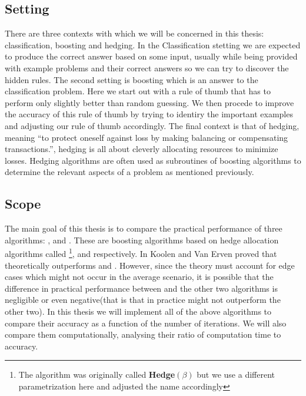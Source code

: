 \subsection{Setting}
There are three contexts with which we will be concerned in this thesis: classification, boosting and hedging.
In the Classification stetting we are expected to produce the correct answer based on some input, usually while being provided with example problems and their correct answers so we can try to discover the hidden rules. The second setting is boosting which is an answer to the classification problem. Here we start out with a rule of thumb that has to perform only slightly better than random guessing. We then procede to improve the accuracy of this rule of thumb by trying to identiry the important examples and adjusting our rule of thumb accordingly. The final context is that of hedging, meaning ``to protect oneself against loss by making balancing or compensating transactions.'', hedging is all about cleverly allocating resources to minimize losses. Hedging algorithms are often used as subroutines of boosting algorithms to determine the relevant aspects of a problem as mentioned previously. 
\newpage
\subsection{Scope}
The main goal of this thesis is to compare the practical performance of three algorithms: \adaB, \NHB and \squintB. These are boosting algorithms based on hedge allocation algorithms called \hedge\footnote{The algorithm was originally called \textbf{Hedge}$(\beta)$ but we use a different parametrization here and adjusted the name accordingly}, \adaN and \squint respectively. In \cite{Koolen2015} Koolen and Van Erven proved that \squint theoretically outperforms \hedge and \adaN. However, since the theory must account for edge cases which might not occur in the average scenario, it is possible that the difference in practical performance between \squint and the other two algorithms is negligible or even negative(that is that in practice \squintB might not outperform the other two). In this thesis we will implement all of the above algorithms to compare their accuracy as a function of the number of iterations. We will also compare them computationally, analysing their ratio of computation time to accuracy.  

